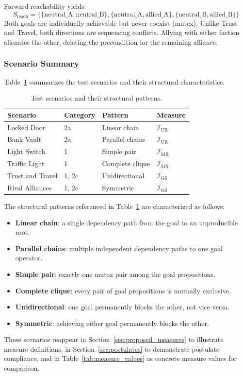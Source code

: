 Forward reachability yields:
\begin{equation*}
  S_{\text{reach}} = \{\{\text{neutral\_A}, \text{neutral\_B}\}, \{\text{neutral\_A}, \text{allied\_A}\}, \{\text{neutral\_B}, \text{allied\_B}\}\}
\end{equation*}
Both goals are individually achievable but never coexist (mutex). Unlike Trust and Travel, both directions are sequencing conflicts. Allying with either faction alienates the other, deleting the precondition for the remaining alliance.

\subsubsection{Scenario Summary}

Table~\ref{tab:scenario_summary} summarizes the test scenarios and their structural characteristics.

\begin{table}[ht]
  \centering
  \small
  \begin{tabular}{llll}
    \toprule
    Scenario         & Category & Pattern         & Measure                   \\
    \midrule
    Locked Door      & 2a       & Linear chain    & $\mathcal{I}_{\text{UR}}$ \\
    Bank Vault       & 2a       & Parallel chains & $\mathcal{I}_{\text{UR}}$ \\
    Light Switch     & 1        & Simple pair     & $\mathcal{I}_{\text{MX}}$ \\
    Traffic Light    & 1        & Complete clique & $\mathcal{I}_{\text{MX}}$ \\
    Trust and Travel & 1, 2c    & Unidirectional  & $\mathcal{I}_{\text{GS}}$ \\
    Rival Alliances  & 1, 2c    & Symmetric       & $\mathcal{I}_{\text{GS}}$ \\
    \bottomrule
  \end{tabular}
  \caption{Test scenarios and their structural patterns.}
  \label{tab:scenario_summary}
\end{table}

The structural patterns referenced in Table~\ref{tab:scenario_summary} are characterized as follows:
\begin{itemize}
  \item \textbf{Linear chain}: a single dependency path from the goal to an unproducible root.
  \item \textbf{Parallel chains}: multiple independent dependency paths to one goal operator.
  \item \textbf{Simple pair}: exactly one mutex pair among the goal propositions.
  \item \textbf{Complete clique}: every pair of goal propositions is mutually exclusive.
  \item \textbf{Unidirectional}: one goal permanently blocks the other, not vice versa.
  \item \textbf{Symmetric}: achieving either goal permanently blocks the other.
\end{itemize}

These scenarios reappear in Section~\ref{sec:proposed_measures} to illustrate measure definitions, in Section~\ref{sec:postulates} to demonstrate postulate compliance, and in Table~\ref{tab:measure_values} as concrete measure values for comparison.
